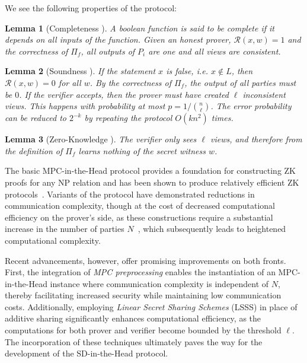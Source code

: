 \documentclass[twoside,11pt,openright]{report}
\theoremstyle{definition}
\theoremstyle{plain}
\newtheorem{lemma}{Lemma}[section]
\begin{document}
We see the following properties of the protocol:

\begin{lemma}[Completeness \cite{ishai2007zero}]
  \label{def:mpcinth_completeness}
  A boolean function is said to be complete if it depends on all inputs of the function. Given an honest prover, $\mathcal{R}(x,w) = 1$ and the correctness of $\Pi_f$, all outputs of $P_i$ are one and all views are consistent.
\end{lemma}

\begin{lemma}[Soundness \cite{ishai2007zero}]
  If the statement $x$ is false, i.e. $x \notin L$, then $\mathcal{R}(x,w) = 0$ for all $w$. By the correctness of $\Pi_f$, the output of all parties must be $0$. If the verifier accepts, then the prover must have created $\ell$ inconsistent views. This happens with probability at most $p = 1 / \binom{n}{\ell}$. The error probability can be reduced to $2^{-k}$ by repeating the protocol $O(kn^2)$ times.
\end{lemma}

\begin{lemma}[Zero-Knowledge \cite{ishai2007zero}]
  The verifier only sees $\ell$ views, and therefore from the definition of $\Pi_f$ learns nothing of the secret witness $w$.
\end{lemma}

The basic MPC-in-the-Head protocol provides a foundation for constructing ZK proofs for any NP relation and has been shown to produce relatively efficient ZK protocols~\cite{feneuil2023threshold,baum2020concretely,katz2018improved}. Variants of the protocol have demonstrated reductions in communication complexity, though at the cost of decreased computational efficiency on the prover's side, as these constructions require a substantial increase in the number of parties $N$~\cite{ishai2007zero, feneuil2023threshold}, which subsequently leads to heightened computational complexity.

Recent advancements, however, offer promising improvements on both fronts. First, the integration of \textit{MPC preprocessing}\cite{katz2018improved} enables the instantiation of an MPC-in-the-Head instance where communication complexity is independent of $N$, thereby facilitating increased security while maintaining low communication costs. Additionally, employing \textit{Linear Secret Sharing Schemes} (LSSS)\cite{feneuil2023threshold} in place of additive sharing significantly enhances computational efficiency, as the computations for both prover and verifier become bounded by the threshold $\ell$. The incorporation of these techniques ultimately paves the way for the development of the SD-in-the-Head protocol.
\end{document}
